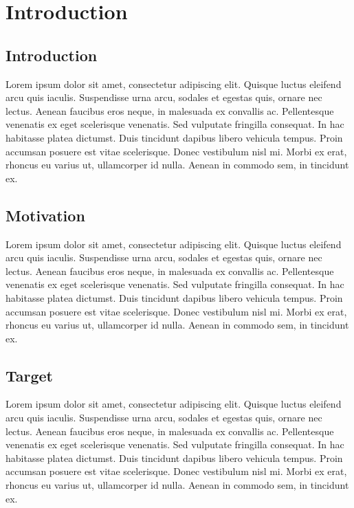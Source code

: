 
\chapter{Introduction} %

\label{Introduction} %

\section{Introduction}
Lorem ipsum dolor sit amet, consectetur adipiscing elit. Quisque luctus eleifend arcu quis iaculis. Suspendisse urna arcu, sodales et egestas quis, ornare nec lectus. Aenean faucibus eros neque, in malesuada ex convallis ac. Pellentesque venenatis ex eget scelerisque venenatis. Sed vulputate fringilla consequat. In hac habitasse platea dictumst. Duis tincidunt dapibus libero vehicula tempus. Proin accumsan posuere est vitae scelerisque. Donec vestibulum nisl mi. Morbi ex erat, rhoncus eu varius ut, ullamcorper id nulla. Aenean in commodo sem, in tincidunt ex.

\section{Motivation}

Lorem ipsum dolor sit amet, consectetur adipiscing elit. Quisque luctus eleifend arcu quis iaculis. Suspendisse urna arcu, sodales et egestas quis, ornare nec lectus. Aenean faucibus eros neque, in malesuada ex convallis ac. Pellentesque venenatis ex eget scelerisque venenatis. Sed vulputate fringilla consequat. In hac habitasse platea dictumst. Duis tincidunt dapibus libero vehicula tempus. Proin accumsan posuere est vitae scelerisque. Donec vestibulum nisl mi. Morbi ex erat, rhoncus eu varius ut, ullamcorper id nulla. Aenean in commodo sem, in tincidunt ex.

\section{Target}
Lorem ipsum dolor sit amet, consectetur adipiscing elit. Quisque luctus eleifend arcu quis iaculis. Suspendisse urna arcu, sodales et egestas quis, ornare nec lectus. Aenean faucibus eros neque, in malesuada ex convallis ac. Pellentesque venenatis ex eget scelerisque venenatis. Sed vulputate fringilla consequat. In hac habitasse platea dictumst. Duis tincidunt dapibus libero vehicula tempus. Proin accumsan posuere est vitae scelerisque. Donec vestibulum nisl mi. Morbi ex erat, rhoncus eu varius ut, ullamcorper id nulla. Aenean in commodo sem, in tincidunt ex.
